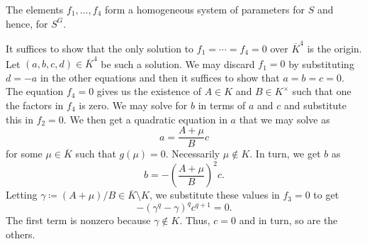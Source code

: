 \documentclass[12pt]{article}
\begin{document}
	\begin{thm}
		The elements $f_{1}, \ldots, f_{4}$ form a homogeneous system of parameters for $S$ and hence, for $S^{G}$.
	\end{thm}
	\begin{sketch}
		It suffices to show that the only solution to $f_{1} = \cdots = f_{4} = 0$ over $\overline{K}^{4}$ is the origin. 
		Let $(a, b, c, d) \in \overline{K}^{4}$ be such a solution. 
		We may discard $f_{1} = 0$ by substituting $d = -a$ in the other equations and then it suffices to show that $a = b = c = 0$. 
		The equation $f_{4} = 0$ gives us the existence of $A \in K$ and $B \in K^{\times}$ such that one the factors in $f_{4}$ is zero. 
		We may solve for $b$ in terms of $a$ and $c$ and substitute this in $f_{2} = 0$. 
		We then get a quadratic equation in $a$ that we may solve as
		\begin{equation*} 
			a = \frac{A + \mu}{B} c
		\end{equation*}
		for some $\mu \in \overline{K}$ such that $g(\mu) = 0$.
		Necessarily $\mu \notin K$. 
		In turn, we get $b$ as
		\begin{equation*} 
			b = -\left(\frac{A + \mu}{B}\right)^{2} c.
		\end{equation*}
		Letting $\gamma \coloneqq (A + \mu)/B \in \overline{K} \setminus K$, we substitute these values in $f_{3} = 0$ to get
		\begin{equation*} 
			-(\gamma^{q} - \gamma)^{q} c^{q + 1} = 0.
		\end{equation*}
		The first term is nonzero because $\gamma \notin K$. Thus, $c = 0$ and in turn, so are the others.
	\end{sketch}

\end{document}
